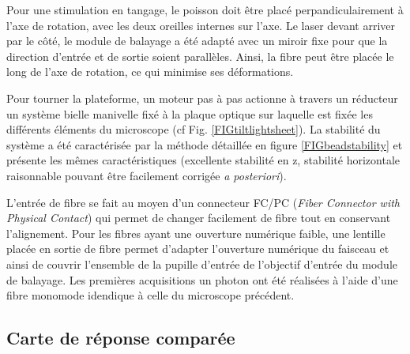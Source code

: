 Pour une stimulation en tangage, le poisson doit être placé perpandiculairement à l'axe de rotation, avec les deux oreilles internes sur l'axe. Le laser devant arriver par le côté, le module de balayage a été adapté avec un miroir fixe pour que la direction d'entrée et de sortie soient parallèles. Ainsi, la fibre peut être placée le long de l'axe de rotation, ce qui minimise ses déformations.

Pour tourner la plateforme, un moteur pas à pas actionne à travers un réducteur un système bielle manivelle fixé à la plaque optique sur laquelle est fixée les différents éléments du microscope (cf Fig. \ref{FIGtiltlightsheet}). La stabilité du système a été caractérisée par la méthode détaillée en figure \ref{FIGbeadstability} et présente les mêmes caractéristiques (excellente stabilité en z, stabilité horizontale raisonnable pouvant être facilement corrigée \emph{a posteriori}).

L'entrée de fibre se fait au moyen d'un connecteur FC/PC (\emph{Fiber Connector with Physical Contact}) qui permet de changer facilement de fibre tout en conservant l'alignement. Pour les fibres ayant une ouverture numérique faible, une lentille placée en sortie de fibre permet d'adapter l'ouverture numérique du faisceau et ainsi de couvrir l'ensemble de la pupille d'entrée de l'objectif d'entrée du module de balayage. Les premières acquisitions un photon ont été réalisées à l'aide d'une fibre monomode idendique à celle du microscope précédent.

\subsection{Carte de réponse comparée}

